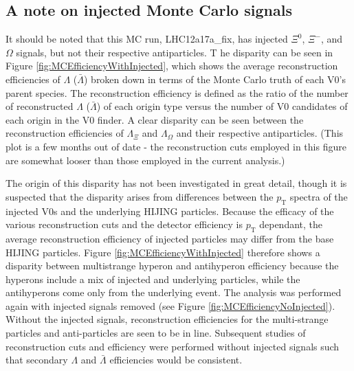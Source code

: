 \subsection{A note on injected Monte Carlo signals}
\label{sec:InjectedMCSignals}

It should be noted that this MC run, LHC12a17a\_fix, has injected $\Xi^0$, $\Xi^-$, and $\Omega$ signals, but not their respective antiparticles.  T
he disparity can be seen in Figure \ref{fig:MCEfficiencyWithInjected}, which shows the average reconstruction efficiencies of $\Lambda$ ($\bar{\Lambda}$) broken down in terms of the Monte Carlo truth of each V0's parent species. 
The reconstruction efficiency is defined as the ratio of the number of reconstructed $\Lambda$ ($\bar{\Lambda}$) of each origin type versus the number of V0 candidates of each origin in the V0 finder.  
A clear disparity can be seen between the reconstruction efficiencies of $\Lambda_{\Xi}$ and $\Lambda_{\Omega}$ and their respective antiparticles.  
(This plot is a few months out of date - the reconstruction cuts employed in this figure are somewhat looser than those employed in the current analysis.)

The origin of this disparity has not been investigated in great detail, though it is suspected that the disparity arises from differences between the $p_\mathrm{T}$ spectra of the injected V0s and the underlying HIJING particles.  
Because the efficacy of the various reconstruction cuts and the detector efficiency is $p_\mathrm{T}$ dependant, the average reconstruction efficiency of injected particles may differ from the base HIJING particles.  
Figure \ref{fig:MCEfficiencyWithInjected} therefore shows a disparity between multistrange hyperon and antihyperon efficiency because the hyperons include a mix of injected and underlying particles, while the antihyperons come only from the underlying event. 
The analysis was performed again with injected signals removed (see Figure \ref{fig:MCEfficiencyNoInjected}).  
Without the injected signals, reconstruction efficiencies for the multi-strange particles and anti-particles are seen to be in line.  
Subsequent studies of reconstruction cuts and efficiency were performed without injected signals such that secondary $\Lambda$ and $\bar{\Lambda}$ efficiencies would be consistent.

